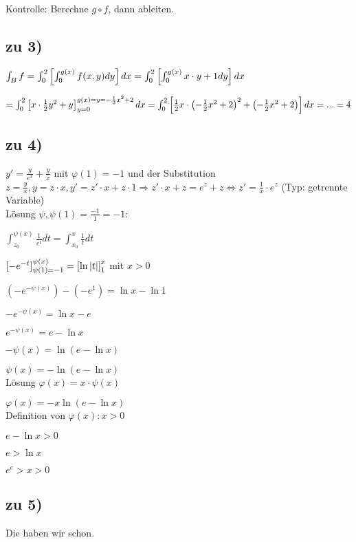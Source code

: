 Kontrolle: Berechne $ g\circ f$, dann ableiten. 

\subsection{zu 3)}
$
\int_{B} f
= \int_{0}^{2}  \left[  \int_{0}^{g(x)} f(x,y) dy \right]  dx 
= \int_{0}^{2}  \left[  \int_{0}^{g(x)} x\cdot y + 1 dy \right]  dx
$

$
= \int_{0}^{2}  \left[  x\cdot \frac{1}{2} y^2 + y \right] _{y=0}^{g(x)=y=-\frac{1}{2} x^2 + 2} dx  
= \int_{0}^{2}  \left[ \frac{1}{2} x \cdot  \left( -\frac{1}{2} x^2 + 2 \right) ^2 +  \left( -\frac{1}{2} x^2 + 2 \right)   \right]  dx
= ...
= 4
$

\subsection{zu 4)}
$ y' = \frac{y}{e^x} + \frac{y}{x} $ mit $\varphi(1) = -1$ und der Substitution 
$ z = \frac{y}{x},  y=z\cdot x, y' = z' \cdot x + z \cdot 1 \Rightarrow z' \cdot x + z = e^z + z \Leftrightarrow z' = \frac{1}{x} \cdot e^z$ (Typ: getrennte Variable)\\

Lösung $\psi, \psi(1) = \frac{-1}{1}=-1$:

$ \int_{z_0}^{\psi(x)} \frac{1}{e^t} dt = \int_{x_0}^{x} \frac{1}{t} dt$ 

$  \left[ - e^{-t} \right] _{\psi(1) = -1}^{\psi(x)} =  \left[ \ln  \left\vert t \right\vert  \right] _1^x $ mit $x>0$

$ (-e^{-\psi(x)}) - (-e^1) = \ln x - \ln 1 $ 

$ -e^{-\psi(x)} = \ln x - e $ 

$ e^{-\psi(x)} = e - \ln x $

$-\psi(x) = \ln (e- \ln x)$

$\psi(x) = - \ln (e- \ln x)$\\

Lösung $\varphi(x) = x\cdot \psi(x) $

$\varphi(x) = - x \ln(e - \ln x)$\\

Definition von $\varphi(x) : x > 0$

$e - \ln x > 0 $

$e > \ln x$

\underline{$ e^e > x > 0 $}

\subsection{zu 5)}
Die haben wir schon. 
